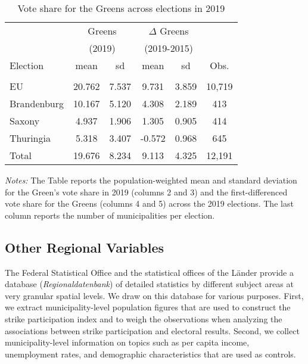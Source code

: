 \begin{table}[ht]\centering
	\begin{threeparttable}
		\caption{Vote share for the Greens across elections in 2019}
		\label{tab_greta_cons:data_greens_vote_share}
		\begin{tabular*}{.7\linewidth}{@{\extracolsep{\fill}}l*{5}{c}}
			\toprule

			&\multicolumn{2}{c}{Greens}&\multicolumn{2}{c}{$\Delta$ Greens}\\
			&\multicolumn{2}{c}{(2019)}&\multicolumn{2}{c}{(2019-2015)}\\
			\cmidrule(lr){2-3}\cmidrule(lr){4-5}
			Election		&	mean		&	sd		&	mean	& sd	&	Obs.	\\
			\midrule\\
			
			EU				&	20.762		&	7.537	&	9.731	& 3.859	&	10,719	\\
			Brandenburg		&	10.167		&	5.120	&	4.308	& 2.189	&	413		\\
			Saxony			&	4.937		&	1.906	&	1.305	& 0.905	&	414		\\
			Thuringia		&	5.318		&	3.407	&	-0.572	& 0.968	&	645		\\  
			\midrule
			Total			&	19.676		&	8.234	&	9.113	& 4.325	&	12,191	\\
			\bottomrule
		\end{tabular*}
		\begin{tablenotes} 
			\item \scriptsize \emph{Notes:} The Table reports the population-weighted mean and standard deviation for the Green's vote share in 2019 (columns 2 and 3) and the first-differenced vote share for the Greens (columns 4 and 5) across the 2019 elections. The last column reports the number of municipalities per election. 
		\end{tablenotes} 
	\end{threeparttable}
\end{table}





\subsection{Other Regional Variables}
The Federal Statistical Office and the statistical offices of the Länder provide a database (\textit{Regionaldatenbank}) of detailed statistics by different subject areas at very granular spatial levels. We draw on this database for various purposes. First, we extract municipality-level population figures that are used to construct the strike participation index and to weigh the observations when analyzing the associations between strike participation and electoral results. Second, we collect municipality-level information on topics such as per capita income, unemployment rates, and demographic characteristics that are used as controls.










